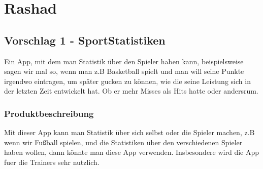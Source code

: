 \section{Rashad}

\subsection{Vorschlag 1 - SportStatistiken}
Ein App, mit dem man Statistik über den Spieler haben kann, beispielsweise sagen wir mal so, wenn man z.B Basketball spielt und man will seine Punkte irgendwo eintragen, um später gucken zu können, wie die seine Leistung sich in der letzten Zeit entwickelt hat. Ob er mehr Misses als Hits hatte oder andersrum. 


\subsubsection{Produktbeschreibung}
Mit dieser App kann man Statistik über sich selbst oder die Spieler machen, z.B wenn wir Fußball spielen, und die Statistiken über den verschiedenen Spieler haben wollen, dann könnte man diese App verwenden. Insbesondere wird die App fuer die Trainers sehr nutzlich.

\vspace{0.2cm}

